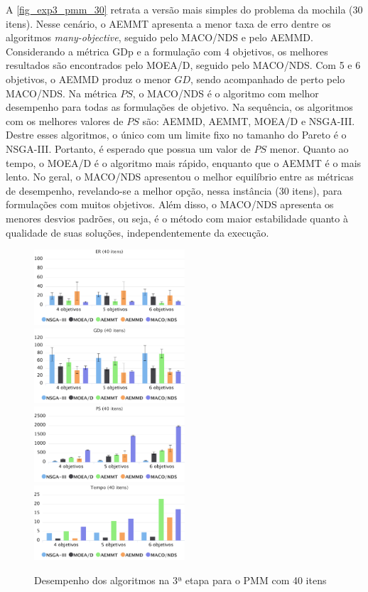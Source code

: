 A \autoref{fig_exp3_pmm_30} retrata a versão mais simples do problema da mochila (30 itens). Nesse cenário, o AEMMT apresenta a menor taxa de erro dentre os algoritmos \textit{many-objective}, seguido pelo MACO/NDS e pelo AEMMD. Considerando a métrica GDp e a formulação com 4 objetivos, os melhores resultados são encontrados pelo MOEA/D, seguido pelo MACO/NDS. Com 5 e 6 objetivos, o AEMMD produz o menor $GD$, sendo acompanhado de perto pelo MACO/NDS. Na métrica $PS$, o MACO/NDS é o algoritmo com melhor desempenho para todas as formulações de objetivo. Na sequência, os algoritmos com os melhores valores de $PS$ são: AEMMD, AEMMT, MOEA/D e NSGA-III. Destre esses algoritmos, o único com um limite fixo no tamanho do Pareto é o NSGA-III. Portanto, é esperado que possua um valor de $PS$ menor. Quanto ao tempo, o MOEA/D é o algoritmo mais rápido, enquanto que o AEMMT é o mais lento. No geral, o MACO/NDS apresentou o melhor equilíbrio entre as métricas de desempenho, revelando-se a melhor opção, nessa instância (30 itens), para formulações com muitos objetivos. Além disso, o MACO/NDS apresenta os menores desvios padrões, ou seja, é o método com maior estabilidade quanto à qualidade de suas soluções, independentemente da execução.

\begin{figure}[!htbp]	
	\includegraphics[width=0.5\textwidth]{cap_experimentos/figs/etapa3/er-mkp-40}
	\includegraphics[width=0.5\textwidth]{cap_experimentos/figs/etapa3/gd-mkp-40}
	\includegraphics[width=0.5\textwidth]{cap_experimentos/figs/etapa3/ps-mkp-40}
	\includegraphics[width=0.5\textwidth]{cap_experimentos/figs/etapa3/time-mkp-40}
	\caption{\label{fig_exp3_pmm_40}Desempenho dos algoritmos na 3ª etapa para o PMM com 40 itens}
\end{figure}

